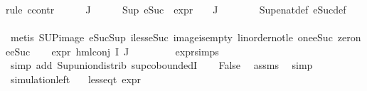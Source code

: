 \begin{isabellebody}
%
\isadelimproof
%
\endisadelimproof
%
\isatagproof
{}\isamarkupfalse%
{\isacharparenleft}{\kern0pt}rule\ ccontr{\isacharparenright}{\kern0pt}\isanewline
\ \ \isamarkupfalse%
\ {\isachardoublequoteopen}{\isasymPhi}\ {\isacharbackquote}{\kern0pt}\ J\ {\isasymnoteq}\ {\isacharbraceleft}{\kern0pt}{\isacharbraceright}{\kern0pt}{\isachardoublequoteclose}\isanewline
\ \ \isamarkupfalse%
\ {\isachardoublequoteopen}Sup\ {\isacharparenleft}{\kern0pt}{\isacharparenleft}{\kern0pt}eSuc\ {\isasymcirc}\ expr{\isacharunderscore}{\kern0pt}{}\ {\isasymcirc}\ {\isasymPhi}{\isacharparenright}{\kern0pt}\ {\isacharbackquote}{\kern0pt}\ J{\isacharparenright}{\kern0pt}\ {\isasymge}\ {}{\isachardoublequoteclose}\isanewline
\ \ \ \ \isamarkupfalse%
\ Sup{\isacharunderscore}{\kern0pt}enat{\isacharunderscore}{\kern0pt}def\ eSuc{\isacharunderscore}{\kern0pt}def\isanewline
\ \ \ \ \isamarkupfalse%
\ {\isacharparenleft}{\kern0pt}metis\ SUP{\isacharunderscore}{\kern0pt}image\ eSuc{\isacharunderscore}{\kern0pt}Sup\ iless{\isacharunderscore}{\kern0pt}eSuc{}\ image{\isacharunderscore}{\kern0pt}is{\isacharunderscore}{\kern0pt}empty\ linorder{\isacharunderscore}{\kern0pt}not{\isacharunderscore}{\kern0pt}le\ one{\isacharunderscore}{\kern0pt}eSuc\ zero{\isacharunderscore}{\kern0pt}ne{\isacharunderscore}{\kern0pt}eSuc{\isacharparenright}{\kern0pt}\isanewline
\ \ \isamarkupfalse%
\ {\isachardoublequoteopen}expr{\isacharunderscore}{\kern0pt}{}\ {\isacharparenleft}{\kern0pt}hml{\isacharunderscore}{\kern0pt}conj\ I\ J\ {\isasymPhi}{\isacharparenright}{\kern0pt}\ {\isasymge}\ {}{\isachardoublequoteclose}\isanewline
\ \ \ \ \isamarkupfalse%
\ expr{\isacharunderscore}{\kern0pt}{}{\isachardot}{\kern0pt}simps\isanewline
\ \ \ \ \isamarkupfalse%
\ {\isacharparenleft}{\kern0pt}simp\ add{\isacharcolon}{\kern0pt}\ Sup{\isacharunderscore}{\kern0pt}union{\isacharunderscore}{\kern0pt}distrib\ sup{\isachardot}{\kern0pt}coboundedI{}{\isacharparenright}{\kern0pt}\isanewline
\ \ \isamarkupfalse%
\ False\ \isamarkupfalse%
\ assms\ \isamarkupfalse%
\ simp\isanewline
{}\isamarkupfalse%
%
\endisatagproof
{\isafoldproof}%
%
\isadelimproof
\isanewline
%
\endisadelimproof
\isanewline
{}\isamarkupfalse%
\ simulation{\isacharunderscore}{\kern0pt}left{\isacharcolon}{\kern0pt}\isanewline
\ \ \ {\isachardoublequoteopen}{\isacharparenleft}{\kern0pt}less{\isacharunderscore}{\kern0pt}eq{\isacharunderscore}{\kern0pt}t\ {\isacharparenleft}{\kern0pt}expr\ {\isasymphi}{\isacharparenright}{\kern0pt}\ {\isacharparenleft}{\kern0pt}{\isasyminfinity}{\isacharcomma}{\kern0pt}\ {\isasyminfinity}{\isacharcomma}{\kern0pt}\ {\isasyminfinity}{\isacharcomma}{\kern0pt}\ {\isasyminfinity}{\isacharcomma}{\kern0pt}\ {}{\isacharcomma}{\kern0pt}\ {}{\isacharparenright}{\kern0pt}{\isacharparenright}{\kern0pt}{\isachardoublequoteclose}\isanewline

\end{isabellebody}
